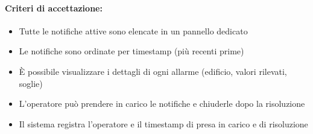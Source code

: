 \paragraph*{Criteri di accettazione:}
\begin{itemize}
    \item Tutte le notifiche attive sono elencate in un pannello dedicato
    \item Le notifiche sono ordinate per timestamp (più recenti prime)
    \item È possibile visualizzare i dettagli di ogni allarme (edificio, valori rilevati, soglie)
    \item L'operatore può prendere in carico le notifiche e chiuderle dopo la risoluzione
    \item Il sistema registra l'operatore e il timestamp di presa in carico e di risoluzione
\end{itemize}


